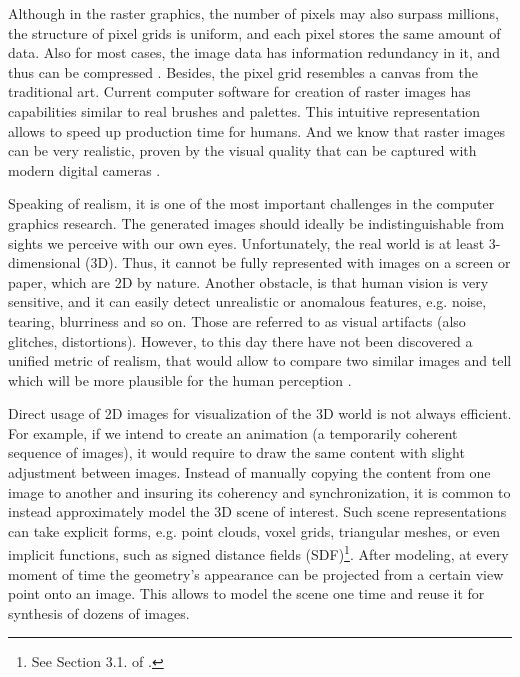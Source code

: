 Although in the raster graphics, the number of pixels may also surpass millions, the structure of pixel grids is uniform, and each pixel stores the same amount of data. Also for most cases, the image data has information redundancy in it, and thus can be compressed \cite{aux:compression18}. Besides, the pixel grid resembles a canvas from the traditional art. Current computer software for creation of raster images has capabilities similar to real brushes and palettes. This intuitive representation allows to speed up production time for humans. And we know that raster images can be very realistic, proven by the visual quality that can be captured with modern digital cameras \cite{aux:camera21}.

Speaking of realism, it is one of the most important challenges in the computer graphics research. The generated images should ideally be indistinguishable from sights we perceive with our own eyes. Unfortunately, the real world is at least 3-dimensional (3D). Thus, it cannot be fully represented with images on a screen or paper, which are 2D by nature. Another obstacle, is that human vision is very sensitive, and it can easily detect unrealistic or anomalous features, e.g. noise, tearing, blurriness and so on. Those are referred to as visual artifacts (also glitches, distortions). However, to this day there have not been discovered a unified metric of realism, that would allow to compare two similar images and tell which will be more plausible for the human perception \cite{metric:wang11}.

Direct usage of 2D images for visualization of the 3D world is not always efficient. For example, if we intend to create an animation (a temporarily coherent sequence of images), it would require to draw the same content with slight adjustment between images. Instead of manually copying the content from one image to another and insuring its coherency and synchronization, it is common to instead approximately model the 3D scene of interest. Such scene representations can take explicit forms, e.g. point clouds, voxel grids, triangular meshes, or even implicit functions, such as signed distance fields (SDF)\cite{survey:advances-nn22}\footnote{See Section 3.1. of \cite{survey:advances-nn22}.}\label{intro:3d-representations-paragraph}. After modeling, at every moment of time the geometry's appearance can be projected from a certain view point onto an image. This allows to model the scene one time and reuse it for synthesis of dozens of images.


